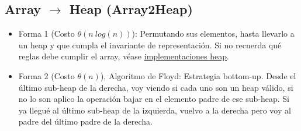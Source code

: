 \documentclass[10pt,a4paper]{article}
\begin{document}
\subsection*{Array $\rightarrow$ Heap (Array2Heap)}
\label{subsec:array_2_heap}
\begin{itemize}
    \item Forma 1 (Costo $\theta(n \ log(n))$): Permutando sus elementos, hasta llevarlo a un heap y que cumpla el invariante de representación. Si no recuerda qué reglas debe cumplir el array, véase \hyperref[subsec:implementaciones_heap]{\underline{implementaciones heap}}.
    \item Forma 2 (Costo $\theta(n)$), Algoritmo de Floyd: Estrategia bottom-up. Desde el último sub-heap de la derecha, voy viendo si cada uno son un heap válido, si no lo son aplico la operación bajar en el elemento padre de ese sub-heap. Si ya llegué al último sub-heap de la izquierda, vuelvo a la derecha pero voy al padre del último padre de la derecha.
\end{itemize}
\end{document}

